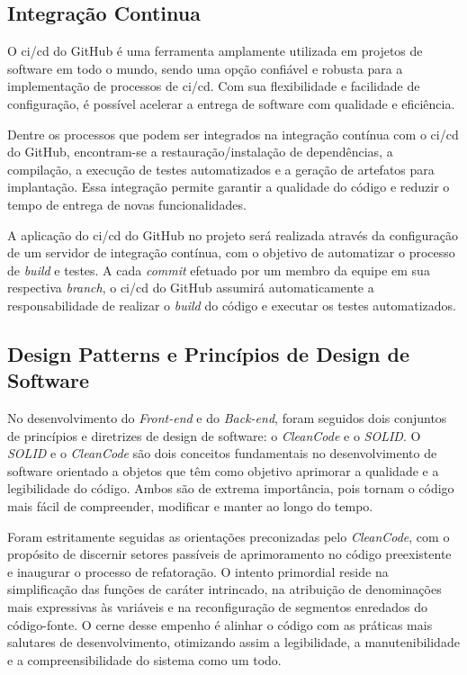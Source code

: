 \subsection{Integração Continua}

O \ac{ci}/\ac{cd} do GitHub é uma ferramenta amplamente utilizada em projetos de software em todo o mundo, sendo uma opção confiável e robusta para a implementação de processos de \ac{ci}/\ac{cd}. Com sua flexibilidade e facilidade de configuração, é possível acelerar a entrega de software com qualidade e eficiência.

Dentre os processos que podem ser integrados na integração contínua com o \ac{ci}/\ac{cd} do GitHub, encontram-se a restauração/instalação de dependências, a compilação, a execução de testes automatizados e a geração de artefatos para implantação. Essa integração permite garantir a qualidade do código e reduzir o tempo de entrega de novas funcionalidades.

A aplicação do \ac{ci}/\ac{cd} do GitHub no projeto será realizada através da configuração de um servidor de integração contínua, com o objetivo de automatizar o processo de \textit{build} e testes. A cada \textit{commit} efetuado por um membro da equipe em sua respectiva \textit{branch}, o \ac{ci}/\ac{cd} do GitHub assumirá automaticamente a responsabilidade de realizar o \textit{build} do código e executar os testes automatizados.

\subsection{Design Patterns e Princípios de Design de Software}

No desenvolvimento do \textit{\gls{Front-end}} e do \textit{\gls{Back-end}}, foram seguidos dois conjuntos de princípios e diretrizes de design de software: o \textit{\gls{CleanCode}} e o \textit{\gls{SOLID}}. O \textit{\gls{SOLID}} e o \textit{\gls{CleanCode}} são dois conceitos fundamentais no desenvolvimento de software orientado a objetos que têm como objetivo aprimorar a qualidade e a legibilidade do código. Ambos são de extrema importância, pois tornam o código mais fácil de compreender, modificar e manter ao longo do tempo.

Foram estritamente seguidas as orientações preconizadas pelo \textit{\gls{CleanCode}}, com o propósito de discernir setores passíveis de aprimoramento no código preexistente e inaugurar o processo de refatoração. O intento primordial reside na simplificação das funções de caráter intrincado, na atribuição de denominações mais expressivas às variáveis e na reconfiguração de segmentos enredados do código-fonte. O cerne desse empenho é alinhar o código com as práticas mais salutares de desenvolvimento, otimizando assim a legibilidade, a manutenibilidade e a compreensibilidade do sistema como um todo.

